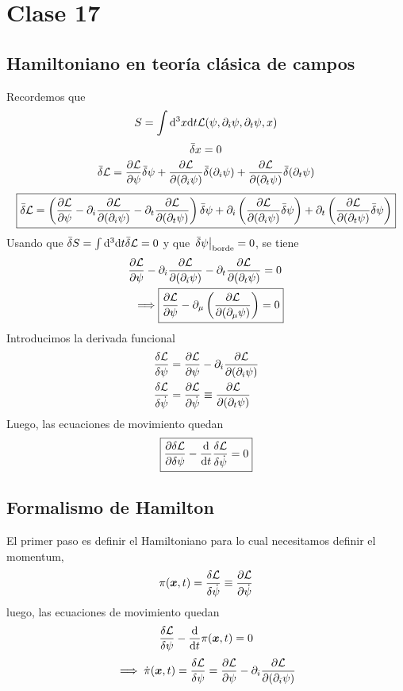 \section{Clase 17}
\subsection{Hamiltoniano en teoría clásica de campos}
Recordemos que
\begin{equation}
  S=\int\dd^3x\dd t\mathcal{L} (\psi,\partial_i\psi,\partial_t\psi,x)
\end{equation}
\begin{equation}
  \bar{\delta} x=0
\end{equation}
\begin{equation}
  \bar{\delta}\mathcal{L}=\pdv{\mathcal{L}}{\psi}\bar{\delta}\psi+\pdv{\mathcal{L}}{(\partial_i\psi)}\bar{\delta} (\partial_i\psi)+\pdv{\mathcal{L}}{(\partial_t\psi)}\bar{\delta}(\partial_t\psi)
\end{equation}
\begin{equation}
 \boxed{ \bar{\delta}\mathcal{L}=\left(\pdv{\mathcal{L}}{\psi}-\partial_i\pdv{\mathcal{L}}{(\partial_i\psi)}-\partial_t\pdv{\mathcal{L}}{(\partial_t\psi)}\right)\bar{\delta}\psi+\partial_i\left(\pdv{\mathcal{L}}{(\partial_i\psi)}\bar{\delta}\psi\right)+\partial_t\left(\pdv{\mathcal{L}}{(\partial_t\psi)}\bar{\delta}\psi\right)}
\end{equation}
Usando que $\bar{\delta} S=\int\dd^3\dd t\bar{\delta}\mathcal{L} =0$ y que $\eval{\db \psi}_{\rm  borde}=0$, se tiene
\begin{align}
  \pdv{\L }{\psi}-\partial_i\pdv{\L }{(\partial_i\psi)}-\partial_t\pdv{\L }{(\partial_t\psi)}&=0\\
 \implies \Aboxed{ \pdv{\L }{\psi}-\partial_\m \left(\pdv{\L }{(\partial_\m \psi)}\right) &=0}
\end{align}
Introducimos la derivada funcional
\begin{align}
  \frac{\delta \mathcal{L} }{\delta \psi}&=\pdv{\mathcal{L}}{\psi}-\partial_i\pdv{\mathcal{L}}{(\partial_i\psi)}\\
  \frac{\delta \mathcal{L} }{\delta \dot{\psi}}&=\pdv{\mathcal{L}}{\dot{\psi}}\equiv \pdv{\mathcal{L}}{(\partial_t\psi)}
\end{align}
Luego, las ecuaciones de movimiento quedan
\begin{equation}
\boxed{  \pdv{\delta\mathcal{L}}{\delta\psi}-\dv{t}\frac{\delta  \mathcal{L} }{\delta \dot{\psi}}=0}
\end{equation}

\subsection{Formalismo de Hamilton}
El primer paso es definir el Hamiltoniano para lo cual necesitamos definir el momentum,
\begin{equation}
  \pi (\vb*{x},t)=\frac{\delta\mathcal{L} }{\delta \dot{\psi}}\equiv\pdv{\mathcal{L}}{\dot{\psi}}
\end{equation}
luego, las ecuaciones de movimiento quedan
\begin{equation}
  \frac{\delta \mathcal{L} }{\delta\psi}-\dv{t}\pi(\vb*{x},t)=0
\end{equation}
\begin{equation}
  \implies \dot{\pi}(\vb*{x},t)=\frac{\delta \mathcal{L} }{\delta \psi}=\pdv{\mathcal{L}}{\psi}-\partial_i\pdv{\mathcal{L}}{(\partial_i\psi)}
\end{equation}


